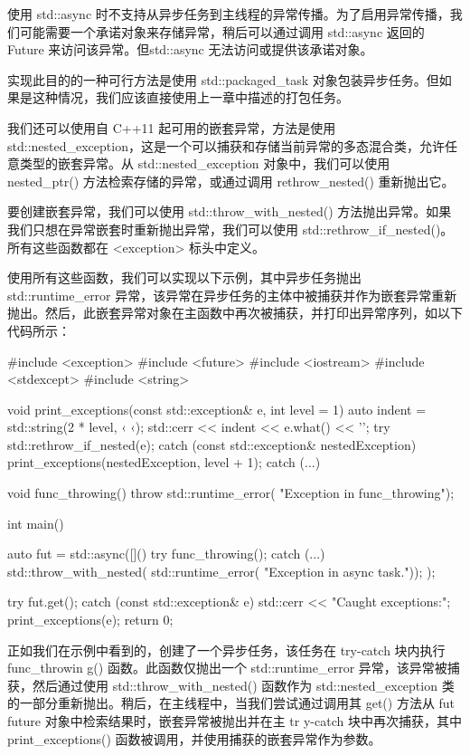
使用 std::async 时不支持从异步任务到主线程的异常传播。为了启用异常传播，我们可能需要一个承诺对象来存储异常，稍后可以通过调用 std::async 返回的 Future 来访问该异常。但std::async 无法访问或提供该承诺对象。

实现此目的的一种可行方法是使用 std::packaged\_task 对象包装异步任务。但如果是这种情况，我们应该直接使用上一章中描述的打包任务。

我们还可以使用自 C++11 起可用的嵌套异常，方法是使用 std::nested\_exception，这是一个可以捕获和存储当前异常的多态混合类，允许任意类型的嵌套异常。从 std::nested\_exception 对象中，我们可以使用 nested\_ptr() 方法检索存储的异常，或通过调用 rethrow\_nested() 重新抛出它。

要创建嵌套异常，我们可以使用 std::throw\_with\_nested() 方法抛出异常。如果我们只想在异常嵌套时重新抛出异常，我们可以使用 std::rethrow\_if\_nested()。所有这些函数都在 <exception> 标头中定义。

使用所有这些函数，我们可以实现以下示例，其中异步任务抛出 std::runtime\_error 异常，该异常在异步任务的主体中被捕获并作为嵌套异常重新抛出。然后，此嵌套异常对象在主函数中再次被捕获，并打印出异常序列，如以下代码所示：

\begin{cpp}
#include <exception>
#include <future>
#include <iostream>
#include <stdexcept>
#include <string>

void print_exceptions(const std::exception& e,
                      int level = 1) {
    auto indent = std::string(2 * level, ‹ ‹);
    std::cerr << indent << e.what() << '\n';
    try {
        std::rethrow_if_nested(e);
    } catch (const std::exception& nestedException) {
        print_exceptions(nestedException, level + 1);
    } catch (...) { }
}

void func_throwing() {
    throw std::runtime_error(
    "Exception in func_throwing");
}

int main() {
    auto fut = std::async([]() {
        try {
            func_throwing();
        } catch (...) {
            std::throw_with_nested(
                std::runtime_error(
                    "Exception in async task."));
        }
    });

    try {
        fut.get();
    } catch (const std::exception& e) {
        std::cerr << "Caught exceptions:\n";
        print_exceptions(e);
    }
    return 0;
}
\end{cpp}

正如我们在示例中看到的，创建了一个异步任务，该任务在 try-catch 块内执行 func\_throwin g() 函数。此函数仅抛出一个 std::runtime\_error 异常，该异常被捕获，然后通过使用 std::throw\_with\_nested() 函数作为 std::nested\_exception 类的一部分重新抛出。稍后，在主线程中，当我们尝试通过调用其 get() 方法从 fut future 对象中检索结果时，嵌套异常被抛出并在主 tr y-catch 块中再次捕获，其中 print\_exceptions() 函数被调用，并使用捕获的嵌套异常作为参数。

